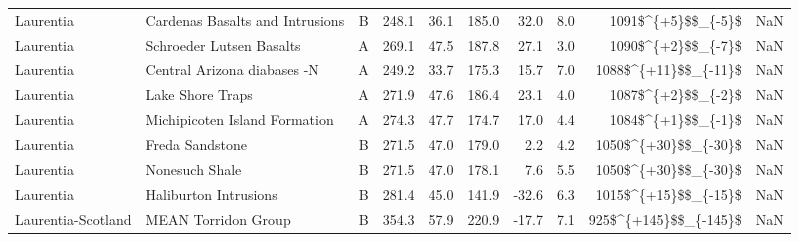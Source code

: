 \begin{longtable}{p{1 in}p{1 in}rrrrrrr}
                     Laurentia &                    Cardenas Basalts and Intrusions &      B &     248.1 &      36.1 & 185.0 &  32.0 &       8.0 &     1091\$\textasciicircum \{+5\}\$\$\_\{-5\}\$ &                                                NaN \\
                     Laurentia &                           Schroeder Lutsen Basalts &      A &     269.1 &      47.5 & 187.8 &  27.1 &       3.0 &     1090\$\textasciicircum \{+2\}\$\$\_\{-7\}\$ &                                                NaN \\
                     Laurentia &                        Central Arizona diabases -N &      A &     249.2 &      33.7 & 175.3 &  15.7 &       7.0 &   1088\$\textasciicircum \{+11\}\$\$\_\{-11\}\$ &                                                NaN \\
                     Laurentia &                                   Lake Shore Traps &      A &     271.9 &      47.6 & 186.4 &  23.1 &       4.0 &     1087\$\textasciicircum \{+2\}\$\$\_\{-2\}\$ &                                                NaN \\
                     Laurentia &                      Michipicoten Island Formation &      A &     274.3 &      47.7 & 174.7 &  17.0 &       4.4 &     1084\$\textasciicircum \{+1\}\$\$\_\{-1\}\$ &                                                NaN \\
                     Laurentia &                                    Freda Sandstone &      B &     271.5 &      47.0 & 179.0 &   2.2 &       4.2 &   1050\$\textasciicircum \{+30\}\$\$\_\{-30\}\$ &                                                NaN \\
                     Laurentia &                                     Nonesuch Shale &      B &     271.5 &      47.0 & 178.1 &   7.6 &       5.5 &   1050\$\textasciicircum \{+30\}\$\$\_\{-30\}\$ &                                                NaN \\
                     Laurentia &                              Haliburton Intrusions &      B &     281.4 &      45.0 & 141.9 & -32.6 &       6.3 &   1015\$\textasciicircum \{+15\}\$\$\_\{-15\}\$ &                                                NaN \\
            Laurentia-Scotland &                                MEAN Torridon Group &      B &     354.3 &      57.9 & 220.9 & -17.7 &       7.1 &  925\$\textasciicircum \{+145\}\$\$\_\{-145\}\$ &                                                NaN \\

\end{longtable}
